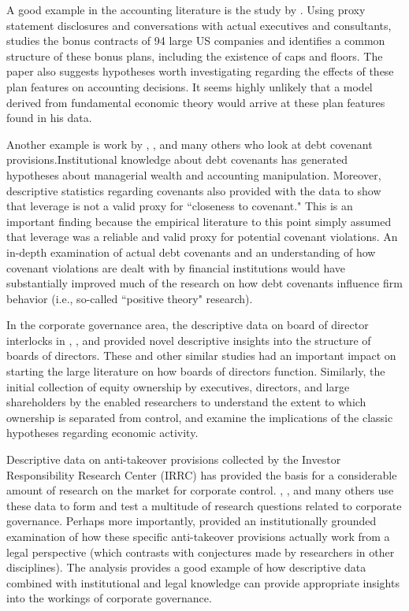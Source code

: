\documentclass[12pt,reqno,titlepage]{amsart}
\theoremstyle{definition}
\begin{document}
\begin{doublespace}
A good example in the accounting literature is the study by \citet{Healy:1985jg}.  
Using proxy statement disclosures and conversations with actual executives and consultants, \citet{Healy:1985jg} studies the bonus contracts of 94 large US companies and identifies a common structure of these bonus plans, including the existence of caps and floors. 
The paper also suggests hypotheses worth investigating regarding the effects of these plan features on accounting decisions.
It seems highly unlikely that a model derived from fundamental economic theory would arrive at these plan features found in his data. 

Another example is work by \citet{SmithJr:1979hv}, \cite{Kalay:1982gv}, and many others who look at debt covenant provisions.Institutional knowledge about debt covenants has
generated hypotheses about managerial wealth and accounting manipulation.
Moreover, descriptive statistics regarding covenants also provided \cite{Dichev:2002} with the data to show that leverage is not a valid proxy for ``closeness to covenant."
This is an important finding because the empirical literature to this point simply assumed that leverage was a reliable and valid proxy for potential covenant violations.  
An in-depth examination of actual debt covenants and an understanding of how covenant violations are dealt with by financial institutions would have substantially improved much of the research on how debt covenants influence firm behavior (i.e., so-called ``positive theory" research).

In the corporate governance area, the descriptive data on board of director interlocks in \citet{brandeis1913breaking}, \citet{us1951report}, and \cite{united1978interlocking} provided novel descriptive insights into the structure of boards of directors.
These and other similar studies had an important impact on starting the large literature on how boards of directors function. 
Similarly, the initial collection of equity ownership by executives, directors, and large shareholders by the \cite{securities1936official} enabled researchers to understand the extent to which ownership is separated from control, and examine the implications of the classic \cite{berle1932modern} hypotheses regarding economic activity.

Descriptive data on anti-takeover provisions collected by the Investor Responsibility Research Center (IRRC) has provided the basis for a considerable amount of research on the market for corporate control. 
\cite{Gompers:2003tl}, \cite{Bebchuk:2009ii}, and many others use these data to form and test a multitude of research questions related to corporate governance.  
Perhaps more importantly, \cite{Daines:2001hi} provided an institutionally grounded examination of how these specific anti-takeover provisions actually work from a legal perspective (which contrasts with conjectures made by researchers in other disciplines).  
The \cite{Daines:2001hi} analysis provides a good example of how descriptive data combined with institutional and legal knowledge can provide appropriate insights into the workings of corporate governance.


\end{doublespace}
\end{document}

